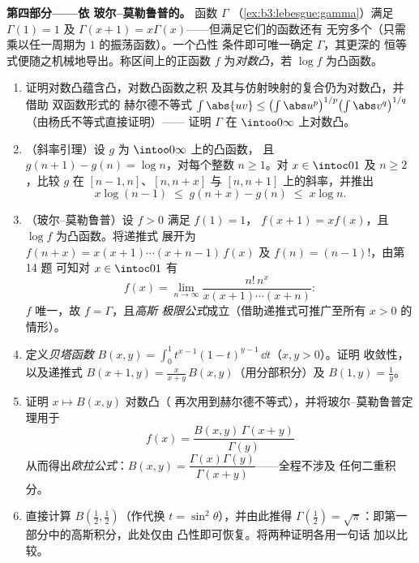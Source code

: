 \begin{problem}
\medskip
\noindent\textbf{第四部分——依
玻尔--莫勒鲁普的。} 函数 $\Gamma$
        （\cref{ex:b3:lebesgue:gamma}）满足 $\Gamma(1) = 1$ 及
        $\Gamma(x+1) = x\Gamma(x)$——但满足它们的函数还有
        无穷多个（只需乘以任一周期为 $1$ 的振荡函数）。一个凸性
        条件即可唯一确定 $\Gamma$，其更深的
        恒等式便随之机械地导出。称区间上的正函数 $f$
        为\emph{对数凸}，若 $\log f$ 为凸函数。
\begin{enumerate}[resume]
  \item 证明对数凸蕴含凸，对数凸函数之积
        及其与仿射映射的复合仍为对数凸，并借助
        双函数形式的
        赫尔德不等式 $\int\abs{uv} \leq
        \bigl(\int\abs u^p\bigr)^{1/p}\bigl(\int\abs
        v^q\bigr)^{1/q}$（由杨氏不等式直接证明）——
        证明 $\Gamma$ 在
        $\intoo0\infty$ 上对数凸。
  \item （斜率引理）设 $g$ 为 $\intoo0\infty$ 上的凸函数，
        且 $g(n+1) - g(n) = \log n$，对每个整数 $n
        \geq 1$。对 $x \in \intoc01$ 及 $n \geq 2$，比较
        $g$ 在 $[n-1, n]$、$[n, n+x]$ 与
        $[n, n+1]$ 上的斜率，并推出
        \[
        x\log(n-1) \;\leq\; g(n + x) - g(n) \;\leq\; x\log n .
        \]
  \item （玻尔--莫勒鲁普）设 $f > 0$ 满足 $f(1) = 1$，
        $f(x+1) = xf(x)$，且 $\log f$ 为凸函数。将递推式
        展开为 $f(n + x) = x(x+1)\cdots(x + n -
        1)\,f(x)$ 及 $f(n) = (n-1)!$，由第 14 题
        可知对 $x \in \intoc01$ 有
        \[
        f(x) = \lim_{n\to\infty}
        \frac{n!\,n^x}{x(x+1)\cdots(x+n)} :
        \]
        $f$ 唯一，故 $f = \Gamma$，且\emph{高斯
        极限公式}成立（借助递推式可推广至所有 $x > 0$
        的情形）。
  \item 定义\emph{贝塔函数} $B(x, y) =
        \int_0^1t^{x-1}(1-t)^{y-1}\,\dd t$（$x, y > 0$）。证明
        收敛性，以及递推式 $B(x+1, y) =
        \frac{x}{x+y}\,B(x, y)$（用分部积分）及
        $B(1, y) = \frac1y$。
  \item 证明 $x \mapsto B(x, y)$ 对数凸（
        再次用到赫尔德不等式），并将玻尔--莫勒鲁普定理用于
        \[
        f(x) = \frac{B(x, y)\,\Gamma(x + y)}{\Gamma(y)}
        \]
        从而得出\emph{欧拉公式}：$B(x, y) =
        \dfrac{\Gamma(x)\Gamma(y)}{\Gamma(x+y)}$——全程不涉及
        任何二重积分。
  \item 直接计算 $B(\frac12, \frac12)$（作代换 $t
        = \sin^2\theta$），并由此推得 $\Gamma(\frac12) =
        \sqrt\pi$：即第一部分中的高斯积分，此处仅由
        凸性即可恢复。将两种证明各用一句话
        加以比较。

\end{enumerate}
\end{problem}
